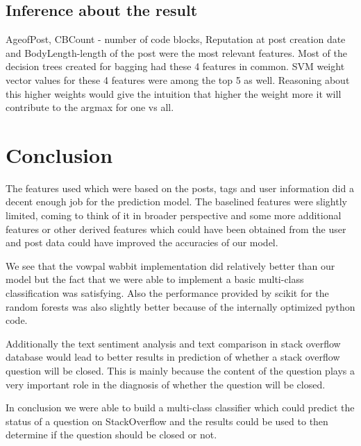 \documentclass[letterpaper,twocolumn,11pt]{article}
\begin{document}
\subsection{Inference about the result}
AgeofPost, CBCount - number of code blocks, Reputation at post creation date and BodyLength-length of the post were the most relevant features. Most of the decision trees created for bagging had these 4 features in common. SVM weight vector values for these 4 features were among the top 5 as well. Reasoning about this higher weights would give the intuition that higher the weight more it will contribute to the argmax for one vs all.


\section{Conclusion}
The features used which were based on the posts, tags and user information did a decent enough job for the prediction model. The baselined features were slightly limited, coming to think of it in broader perspective and some more additional features or other derived features which could have been obtained from the user and post data could have improved the accuracies of our model. 

We see that the vowpal wabbit implementation did relatively better than our model but the fact that we were able to implement a basic multi-class classification was satisfying. Also the performance provided by scikit for the random forests was also slightly better because of the internally optimized python code. 

Additionally the text sentiment analysis and text comparison in stack overflow database would lead to better results in prediction of whether a stack overflow question will be closed. This is mainly because the content of the question plays a very important role in the diagnosis of whether the question will be closed.

In conclusion we were able to build a multi-class classifier which could predict the status of a question on StackOverflow and the results could be used to then determine if the question should be closed or not.
\end{document}

